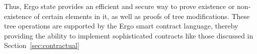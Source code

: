 Thus, Ergo state provides an efficient and secure way to prove existence or non-existence of certain elements in
it, as well as proofs of tree modifications.
These tree operations are supported by the Ergo smart contract language, thereby providing the ability to implement sophisticated contracts like those discussed in Section~\ref{sec:contractual}





